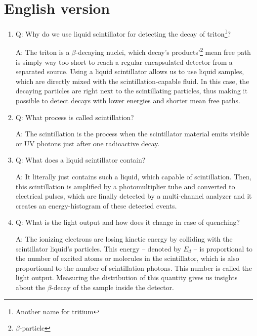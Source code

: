 \section{English version}
\begin{enumerate}
    \item Q: Why do we use liquid scintillator for detecting the decay of triton\footnote{Another name for tritium}? 
    \begin{displayquote}
        A: The triton is a $\beta$-decaying nuclei, which decay's products'\footnote{$\beta$-particle} mean free path is simply way too short to reach a regular encapsulated detector from a separated source. Using a liquid scintillator allows us to use liquid samples, which are directly mixed with the scintillation-capable fluid. In this case, the decaying particles are right next to the scintillating particles, thus making it possible to detect decays with lower energies and shorter mean free paths.
    \end{displayquote}
    
    \item Q: What process is called scintillation?
    \begin{displayquote}
        A: The scintillation is the process when the scintillator material emits visible or UV photons just after one radioactive decay.
    \end{displayquote}
    
    \item Q: What does a liquid scintillator contain?
    \begin{displayquote}
        A: It literally just contains such a liquid, which capable of scintillation. Then, this scintillation is amplified by a photomultiplier tube and converted to electrical pulses, which are finally detected by a multi-channel analyzer and it creates an energy-histogram of these detected events.
    \end{displayquote}
    
    \item Q: What is the light output and how does it change in case of quenching?
    \begin{displayquote}
        A: The ionizing electrons are losing kinetic energy by colliding with the scintillator liquid's particles. This energy -- denoted by $E_{d}$ -- is proportional to the number of excited atoms or molecules in the scintillator, which is also proportional to the number of scintillation photons. This number is called the light output. Measuring the distribution of this quantity gives us insights about the $\beta$-decay of the sample inside the detector.
    \end{displayquote}
    

\end{enumerate}
